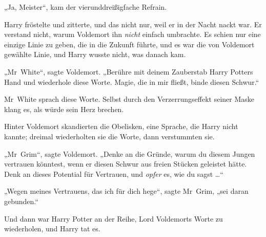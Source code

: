 „Ja, Meister“, kam der vierunddreißigfache Refrain.

Harry fröstelte und zitterte, und das nicht nur, weil er in der Nacht nackt war. Er verstand nicht, warum Voldemort ihn \emph{nicht} einfach umbrachte. Es schien nur eine einzige Linie zu geben, die in die Zukunft führte, und es war die von Voldemort gewählte Linie, und Harry wusste nicht, was danach kam.

„Mr~White“, sagte Voldemort.
„Berühre mit deinem Zauberstab Harry Potters Hand und wiederhole diese Worte. Magie, die in mir fließt, binde diesen Schwur.“

Mr~White sprach diese Worte. Selbst durch den Verzerrungseffekt seiner Maske klang es, als würde sein Herz brechen.

Hinter Voldemort skandierten die Obelisken, eine Sprache, die Harry nicht kannte; dreimal wiederholten sie die Worte, dann verstummten sie.

„Mr~Grim“, sagte Voldemort.
„Denke an die Gründe, warum du diesem Jungen vertrauen könntest, wenn er diesen Schwur aus freien Stücken geleistet hätte. Denk an dieses Potential für Vertrauen, und \emph{opfer} es, wie du sagst …“

„Wegen meines Vertrauens, das ich für dich hege“, sagte Mr~Grim, „sei daran gebunden.“

Und dann war Harry Potter an der Reihe, Lord Voldemorts Worte zu wiederholen, und Harry tat es.

